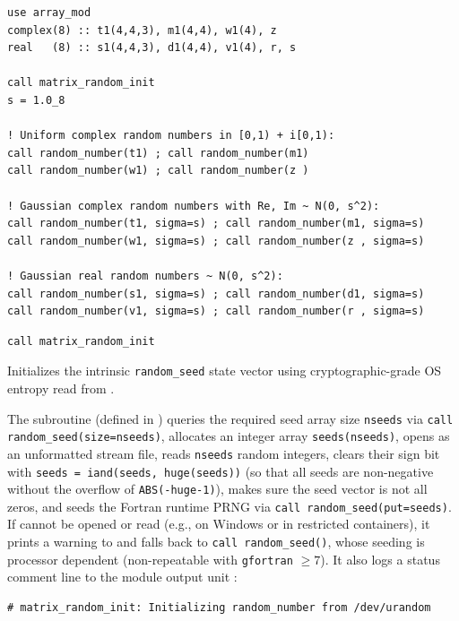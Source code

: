 \lstset{language=[95]Fortran}
\begin{lstlisting}
use array_mod
complex(8) :: t1(4,4,3), m1(4,4), w1(4), z
real   (8) :: s1(4,4,3), d1(4,4), v1(4), r, s

call matrix_random_init
s = 1.0_8

! Uniform complex random numbers in [0,1) + i[0,1):
call random_number(t1) ; call random_number(m1)
call random_number(w1) ; call random_number(z )

! Gaussian complex random numbers with Re, Im ~ N(0, s^2):
call random_number(t1, sigma=s) ; call random_number(m1, sigma=s)
call random_number(w1, sigma=s) ; call random_number(z , sigma=s)

! Gaussian real random numbers ~ N(0, s^2):
call random_number(s1, sigma=s) ; call random_number(d1, sigma=s)
call random_number(v1, sigma=s) ; call random_number(r , sigma=s)
\end{lstlisting}


\lstset{language=[95]Fortran}
\begin{lstlisting}
call matrix_random_init
\end{lstlisting}

Initializes the intrinsic \texttt{random\_seed} state vector using cryptographic-grade OS entropy read from .

The subroutine  (defined in ) queries the required seed array size \texttt{nseeds} via \texttt{call random\_seed(size=nseeds)}, allocates an integer array \texttt{seeds(nseeds)}, opens  as an unformatted stream file, reads \texttt{nseeds} random integers, clears their sign bit with \texttt{seeds = iand(seeds, huge(seeds))} (so that all seeds are non-negative without the overflow of \texttt{ABS(-huge-1)}), makes sure the seed vector is not all zeros, and seeds the Fortran runtime PRNG via \texttt{call random\_seed(put=seeds)}. If  cannot be opened or read (e.g., on Windows or in restricted containers), it prints a warning to  and falls back to \texttt{call random\_seed()}, whose seeding is processor dependent (non-repeatable with \texttt{gfortran} $\ge 7$). It also logs a status comment line to the module output unit :
\begin{verbatim}
# matrix_random_init: Initializing random_number from /dev/urandom
\end{verbatim}

